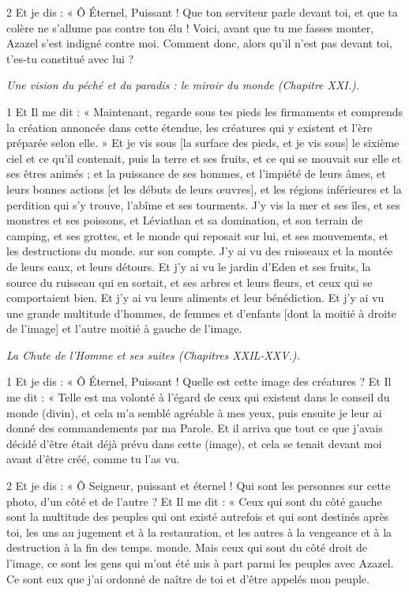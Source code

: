 \par 2 Et je dis : « Ô Éternel, Puissant ! Que ton serviteur parle devant toi, et que ta colère ne s'allume pas contre ton élu ! Voici, avant que tu me fasses monter, Azazel s'est indigné contre moi. Comment donc, alors qu’il n’est pas devant toi, t’es-tu constitué avec lui ?


\par \textit{Une vision du péché et du paradis : le miroir du monde (Chapitre XXI.).}

\par 1 Et Il me dit : « Maintenant, regarde sous tes pieds les firmaments et comprends la création annoncée dans cette étendue, les créatures qui y existent et l'ère préparée selon elle. » Et je vis sous [la surface des pieds, et je vis sous] le sixième ciel et ce qu'il contenait, puis la terre et ses fruits, et ce qui se mouvait sur elle et ses êtres animés ; et la puissance de ses hommes, et l'impiété de leurs âmes, et leurs bonnes actions [et les débuts de leurs œuvres], et les régions inférieures et la perdition qui s'y trouve, l'abîme et ses tourments. J'y vis la mer et ses îles, et ses monstres et ses poissons, et Léviathan et sa domination, et son terrain de camping, et ses grottes, et le monde qui reposait sur lui, et ses mouvements, et les destructions du monde. sur son compte. J'y ai vu des ruisseaux et la montée de leurs eaux, et leurs détours. Et j'y ai vu le jardin d'Eden et ses fruits, la source du ruisseau qui en sortait, et ses arbres et leurs fleurs, et ceux qui se comportaient bien. Et j'y ai vu leurs aliments et leur bénédiction. Et j'y ai vu une grande multitude d'hommes, de femmes et d'enfants [dont la moitié à droite de l'image] et l'autre moitié à gauche de l'image.


\par \textit{La Chute de l'Homme et ses suites (Chapitres XXIL-XXV.).}

\par 1 Et je dis : « Ô Éternel, Puissant ! Quelle est cette image des créatures ? Et Il me dit : « Telle est ma volonté à l'égard de ceux qui existent dans le conseil du monde (divin), et cela m'a semblé agréable à mes yeux, puis ensuite je leur ai donné des commandements par ma Parole. Et il arriva que tout ce que j'avais décidé d'être était déjà prévu dans cette (image), et cela se tenait devant moi avant d'être créé, comme tu l'as vu.

\par 2 Et je dis : « Ô Seigneur, puissant et éternel ! Qui sont les personnes sur cette photo, d’un côté et de l’autre ? Et Il me dit : « Ceux qui sont du côté gauche sont la multitude des peuples qui ont existé autrefois et qui sont destinés après toi, les uns au jugement et à la restauration, et les autres à la vengeance et à la destruction à la fin des temps. monde. Mais ceux qui sont du côté droit de l’image, ce sont les gens qui m’ont été mis à part parmi les peuples avec Azazel. Ce sont eux que j’ai ordonné de naître de toi et d’être appelés mon peuple.

